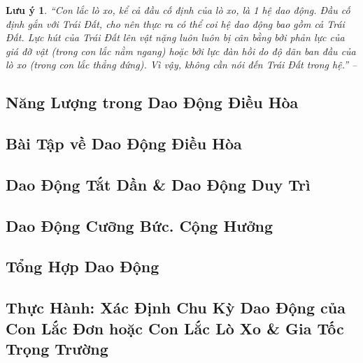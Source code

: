 \documentclass{article}
\numberwithin{equation}{section}
\newtheorem{luuy}{Lưu ý}[section]
\begin{document}
\begin{luuy}
	``Con lắc lò xo, kể cả đầu cố định của lò xo, là 1 hệ dao động. Đầu cố định gắn với Trái Đất, cho nên thực ra có thể coi hệ dao động bao gồm cả Trái Đất. Lực hút của Trái Đất lên vật nặng luôn luôn bị cân bằng bởi phản lực của giá đỡ vật (trong con lắc nằm ngang) hoặc bởi lực đàn hồi do độ dãn ban đầu của lò xo (trong con lắc thẳng đứng). Vì vậy, không cần nói đến Trái Đất trong hệ.'' -- \cite[pp. 39--40]{SGK_Vat_Ly_12_nang_cao}
\end{luuy}


\subsection{Năng Lượng trong Dao Động Điều Hòa}


\subsection{Bài Tập về Dao Động Điều Hòa}


\subsection{Dao Động Tắt Dần \& Dao Động Duy Trì}


\subsection{Dao Động Cưỡng Bức. Cộng Hưởng}


\subsection{Tổng Hợp Dao Động}


\subsection{Thực Hành: Xác Định Chu Kỳ Dao Động của Con Lắc Đơn hoặc Con Lắc Lò Xo \& Gia Tốc Trọng Trường}
\end{document}
